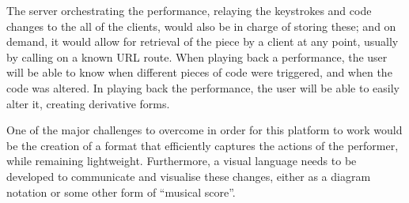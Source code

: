 \documentclass[12pt]{article}
\begin{document}
The server orchestrating the performance, relaying the keystrokes and code changes to the all of the clients, would also be in charge of storing these; and on demand, it would allow for retrieval of the piece by a client at any point, usually by calling on a known URL route. When playing back a performance, the user will be able to know when different pieces of code were triggered, and when the code was altered. In playing back the performance, the user will be able to easily alter it, creating derivative forms.

One of the major challenges to overcome in order for this platform to work would be the creation of a format that efficiently captures the actions of the performer, while remaining lightweight. Furthermore, a visual language needs to be developed to communicate and visualise these changes, either as a diagram notation or some other form of “musical score”.

\printbibliography
\end{document}
